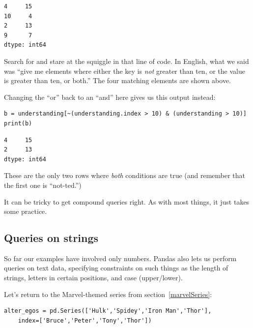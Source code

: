 \begin{Verbatim}[fontsize=\small,samepage=true,frame=leftline,framesep=5mm,framerule=1mm]
4     15
10     4
2     13
9      7
dtype: int64
\end{Verbatim}

Search for and stare at the squiggle in that line of code. In English, what we
said was ``give me elements where either the key is \textit{not} greater than
ten, or the value is greater than ten, or both.'' The four matching elements
are shown above. 

Changing the ``or'' back to an ``and'' here gives us this output instead:

\begin{Verbatim}[fontsize=\CBCodeSmall,samepage=true,frame=single,framesep=3mm]
b = understanding[~(understanding.index > 10) & (understanding > 10)]
print(b)
\end{Verbatim}

\begin{Verbatim}[fontsize=\small,samepage=true,frame=leftline,framesep=5mm,framerule=1mm]
4     15
2     13
dtype: int64
\end{Verbatim}

These are the only two rows where \textit{both} conditions are true (and
remember that the first one is ``not-ted.'')

It can be tricky to get compound queries right. As with most things, it just
takes some practice.

\subsection{Queries on strings}

So far our examples have involved only numbers. Pandas also lets us perform
queries on text data, specifying constraints on such things as the length of
strings, letters in certain positions, and case (upper/lower).


Let's return to the Marvel-themed series from section~\ref{marvelSeries}:

\begin{Verbatim}[fontsize=\footnotesize,samepage=true,frame=single,framesep=3mm]
alter_egos = pd.Series(['Hulk','Spidey','Iron Man','Thor'],
    index=['Bruce','Peter','Tony','Thor'])
\end{Verbatim}


